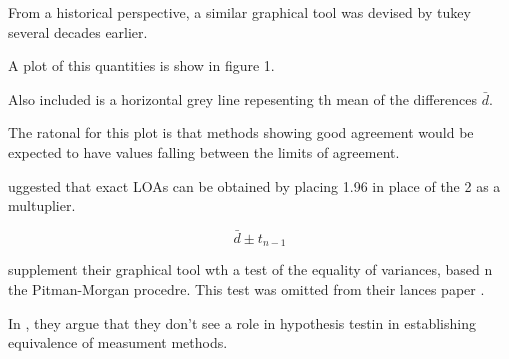 From a historical perspective, a similar graphical tool was devised by tukey several decades earlier.

A plot of this quantities is show in figure 1.

Also included is a horizontal grey line repesenting th mean of the differences $\bar{d}$.


The ratonal for this plot is that methods showing good agreement would be expected to 
have values falling between the limits of agreement.



\citet{BA86} uggested that exact LOAs can be obtained by placing 1.96 in place of the 2 as a multuplier.



\[ \bar{d} \pm t_{n-1}\]


\citet{BA83} supplement their graphical tool wth a test of the equality of variances, based n the Pitman-Morgan procedre. This test was omitted from their lances paper \citet{BA86}.



In \citet{BA99}, they argue that they don't see a role in hypothesis testin in establishing equivalence of measument methods.
